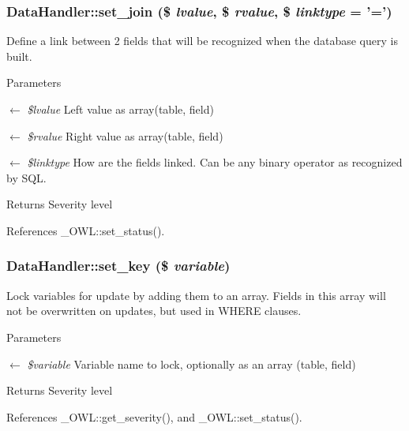 \subsubsection[{set\_\-join}]{\setlength{\rightskip}{0pt plus 5cm}DataHandler::set\_\-join (\$ {\em lvalue}, \/  \$ {\em rvalue}, \/  \$ {\em linktype} = {\ttfamily '='})}\label{classDataHandler_a9b77733f02e9d6281fc40df110c0ba70}
Define a link between 2 fields that will be recognized when the database query is built.


\begin{DoxyParams}{Parameters}
\item[\mbox{$\leftarrow$} {\em \$lvalue}]Left value as array(table, field) \item[\mbox{$\leftarrow$} {\em \$rvalue}]Right value as array(table, field) \item[\mbox{$\leftarrow$} {\em \$linktype}]How are the fields linked. Can be any binary operator as recognized by SQL. \end{DoxyParams}
\begin{DoxyReturn}{Returns}
Severity level 
\end{DoxyReturn}


References \_\-OWL::set\_\-status().

\subsubsection[{set\_\-key}]{\setlength{\rightskip}{0pt plus 5cm}DataHandler::set\_\-key (\$ {\em variable})}\label{classDataHandler_a32ce223478b78a4ea9838a3c6ac7440c}
Lock variables for update by adding them to an array. Fields in this array will not be overwritten on updates, but used in WHERE clauses. 
\begin{DoxyParams}{Parameters}
\item[\mbox{$\leftarrow$} {\em \$variable}]Variable name to lock, optionally as an array (table, field) \end{DoxyParams}
\begin{DoxyReturn}{Returns}
Severity level 
\end{DoxyReturn}


References \_\-OWL::get\_\-severity(), and \_\-OWL::set\_\-status().


